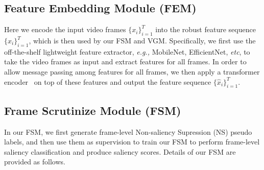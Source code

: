 \documentclass[runningheads]{llncs}
\begin{document}
\subsection{Feature Embedding Module (FEM)}
\label{sec:embed}
Here we encode the input video frames $\{x_i\}_{i=1}^T$ into the robust feature sequence $\{\hat{x}_i\}_{i=1}^T$, which is then used by our FSM and VGM.
Specifically, we first use the off-the-shelf lightweight feature extractor, \textit{e.g.,} MobileNet, EfficientNet, \emph{etc}, to take the video frames as input and extract features for all frames. In order to allow message passing among features for all frames, we then apply a transformer encoder~\cite{transformer} on top of these features and output the feature sequence $\{\hat{x}_i\}_{i=1}^T$.
\subsection{Frame Scrutinize Module (FSM)} \label{fsmodule}

In our FSM, we first generate frame-level Non-saliency Supression (NS) pseudo labels, and then use them as supervision to train our FSM to perform frame-level saliency classification and produce saliency scores. Details of our FSM are provided as follows.
\end{document}
